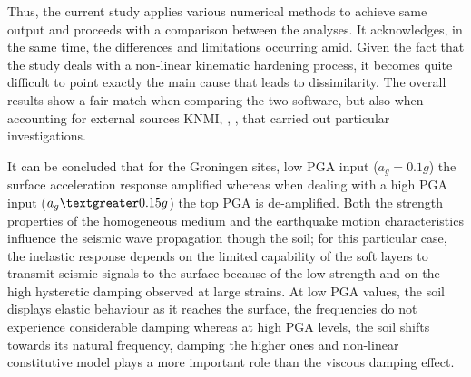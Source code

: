 	 Thus, the current study applies various numerical methods to achieve same output and proceeds with a comparison between the analyses. It acknowledges, in the same time, the differences and limitations occurring amid. Given the fact that the study deals with a non-linear kinematic hardening process, it becomes quite difficult to point exactly the main cause that leads to dissimilarity. The overall results show a fair match when comparing the two software, but also when accounting for external sources KNMI, \cite{dost2012monitoring}, \cite{dost2004scaling}, \cite{dost2013august} that carried out particular investigations. 
		
	It can be concluded that for the Groningen sites, low PGA input ($a_g=0.1g$) the surface acceleration response amplified whereas when dealing with a high PGA input ($a_g\textgreater0.15g$) the top PGA is de-amplified. Both the strength properties of the homogeneous medium and the earthquake motion characteristics influence the seismic wave propagation though the soil; for this particular case, the inelastic response depends on the limited capability of the soft layers to transmit seismic signals to the surface because of the low strength and on the high hysteretic damping observed at large strains. At low PGA values, the soil displays elastic behaviour as it reaches the surface, the frequencies do not experience considerable damping whereas at high PGA levels, the soil shifts towards its natural frequency, damping the higher ones and non-linear constitutive model plays a more important role than the viscous damping effect.